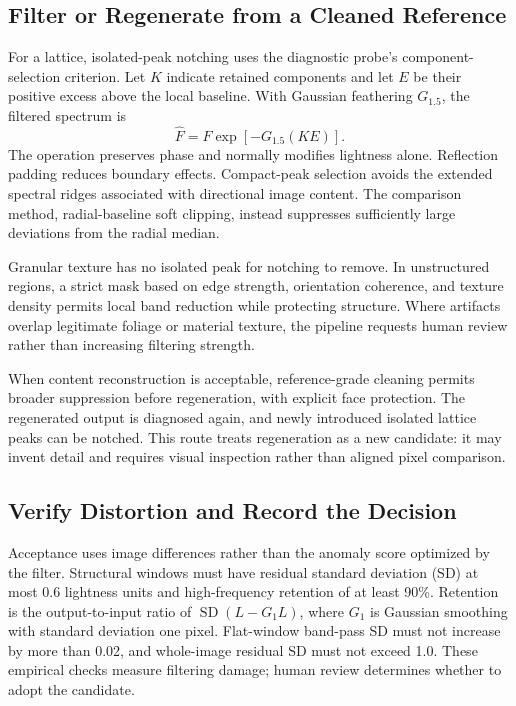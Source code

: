 \documentclass[sigplan,10pt,nonacm]{acmart}
\newcommand{\sd}{\operatorname{SD}}
\begin{document}
\subsection{Filter or Regenerate from a Cleaned Reference}
For a lattice, isolated-peak notching uses the diagnostic probe's component-selection criterion. Let $K$ indicate retained components and let $E$ be their positive excess above the local baseline. With Gaussian feathering $G_{1.5}$, the filtered spectrum is
\begin{equation}
 \widehat F=F\exp[-G_{1.5}(K E)].
 \label{eq:notch}
\end{equation}
The operation preserves phase and normally modifies lightness alone. Reflection padding reduces boundary effects. Compact-peak selection avoids the extended spectral ridges associated with directional image content. The comparison method, radial-baseline soft clipping, instead suppresses sufficiently large deviations from the radial median.

Granular texture has no isolated peak for notching to remove. In unstructured regions, a strict mask based on edge strength, orientation coherence, and texture density permits local band reduction while protecting structure. Where artifacts overlap legitimate foliage or material texture, the pipeline requests human review rather than increasing filtering strength.

When content reconstruction is acceptable, reference-grade cleaning permits broader suppression before regeneration, with explicit face protection. The regenerated output is diagnosed again, and newly introduced isolated lattice peaks can be notched. This route treats regeneration as a new candidate: it may invent detail and requires visual inspection rather than aligned pixel comparison.

\subsection{Verify Distortion and Record the Decision}
Acceptance uses image differences rather than the anomaly score optimized by the filter. Structural windows must have residual standard deviation (SD) at most 0.6 lightness units and high-frequency retention of at least 90\%. Retention is the output-to-input ratio of $\sd(L-G_1L)$, where $G_1$ is Gaussian smoothing with standard deviation one pixel. Flat-window band-pass SD must not increase by more than 0.02, and whole-image residual SD must not exceed 1.0. These empirical checks measure filtering damage; human review determines whether to adopt the candidate.
\end{document}
